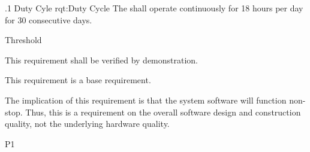\ONERQMTV
{\RqtNumberBase.1}
{Duty Cyle}
{rqt:Duty Cycle}
{The \ThisSystem shall operate continuously for 18 hours per day for 30 consecutive days.}
{
	\item [Phase 1] Threshold
}
{This requirement shall be verified by demonstration.}
{
	\item [N/A] This requirement is a base requirement.
}
{
	\item The implication of this requirement is that the system software will function non-stop. Thus, this is a requirement on the overall software design and construction quality, not the underlying hardware quality.
}
{P1}

